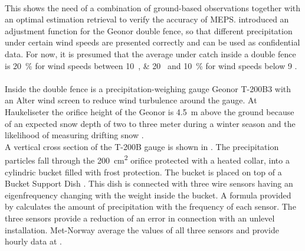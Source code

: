 \\
This shows the need of a combination of ground-based observations together with an optimal estimation retrieval to verify the accuracy of MEPS. \citet{wolff_derivation_2015} introduced an adjustment function for the Geonor double fence, so that different precipitation under certain wind speeds are presented correctly and can be used as confidential data. 
For now, it is presumed that the average under catch inside a double fence is \SI{20}{\percent} for wind speeds between \SIlist{10;20}{\mPs} and \SI{10}{\percent} for wind speeds below \SI{9}{\mPs} \citep{wolff_wmo_2018}.
\\ \\
Inside the double fence is a precipitation-weighing gauge Geonor T-200B3 \citep[3-wire transducers, \SI{1000}{\mm},][]{geonor_inc._t-200b_2015} with an Alter wind screen to reduce wind turbulence around the gauge. At Haukeliseter the orifice height of the Geonor is \SI{4.5}{\metre} above the ground because of an expected snow depth of two to three meter during a winter season and the likelihood of measuring drifting snow \citep{wolff_measurements_2013,wolff_derivation_2015}. \\
A vertical cross section of the T-200B gauge is shown in . The precipitation particles fall through the \SI{200}{\square\cm} orifice protected with a heated collar, into a cylindric bucket filled with frost protection. The bucket is placed on top of a Bucket Support Dish \citep[,][]{geonor_inc._t-200b_2015}. This dish is connected with three wire sensors having an eigenfrequency changing with the weight inside the bucket. A formula provided by \citet{geonor_inc._t-200b_2015} calculates the amount of precipitation with the frequency of each sensor. The three sensors provide a reduction of an error in connection with an unlevel installation. Met-Norway average the values of all three sensors and provide hourly data at \citeauthor{eklima_norwegian_2016}.
